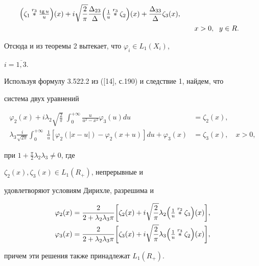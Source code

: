 \begin{exam}
\begin{align*}
\Bigl(\zeta_1\up{r_3}{}\tfrac{\tg u}{u}\Bigr)(x)+


i\sqrt{\frac{2}{\pi}}\frac{\Delta_{23}}{\Delta}\Bigl(


\tfrac{1}{u}\up{r_3}{}\zeta_2\Bigr)(x)+


\frac{\Delta_{33}}{\Delta}\zeta_3(x),\\


&\qquad x>0,\ \; y\in R.


\end{align*}


Отсюда и из теоремы 2 вытекает, что $\varphi_i\in L_1(X_i)$,


$i=\overline{1,3}$.


\end{exam}





\begin{exam}


Используя формулу 3.522.2 из ([14], с.190) и следствие 1, найдем, что


система двух уравнений


\begin{align*}


\varphi_2(x)+i\lambda_2\sqrt{\frac{2}{\pi}}\;\int^{+\infty}_0


\frac{u}{u^2-x^2}\varphi_3(u)du&=\zeta_2(x),\\


\lambda_3\frac{i}{\sqrt{2\pi}}\int^{+\infty}_0\;


\frac{1}{u}[\varphi_2(|x-u|)-\varphi_2(x+u)]du


+\varphi_3(x)&=\zeta_3(x),\quad x>0,


\end{align*}


при $1+\frac{\pi}{2}\lambda_2\lambda_3\ne 0$, где


$\zeta_2(x),\zeta_3(x)\in L_1(R_+)$, непрерывные и


удовлетворяют условиям Дирихле, разрешима и


\begin{align*}


\varphi_2(x)&=\frac{2}{2+\lambda_2\lambda_3\pi}


\biggl[\zeta_2(x)+i\sqrt{\frac{2}{\pi}}\lambda_2


\Bigl(\tfrac{1}{u}\up{r_2}{}\zeta_3\Bigr)(x)\biggr],\\


\varphi_3(x)&=\frac{2}{2+\lambda_2\lambda_3\pi}


\biggl[\zeta_3(x)+i\sqrt{\frac{2}{\pi}}\lambda_3


\Bigl(\tfrac{1}{u}\up{r_3}{}\zeta_2\Bigr)(x)\biggr],


\end{align*}


причем эти решения также принадлежат $L_1(R_+)$.


\end{exam}





